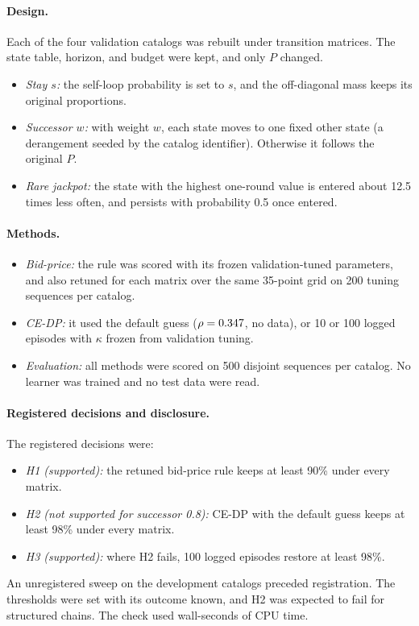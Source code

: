 \documentclass[10pt]{article}
\begin{document}
\paragraph{Design.} Each of the four validation catalogs was rebuilt under \trVariants{} transition matrices. The state table, horizon, and budget were kept, and only $P$ changed.
\begin{itemize}[leftmargin=*]
  \item \emph{Stay $s$:} the self-loop probability is set to $s$, and the off-diagonal mass keeps its original proportions.
  \item \emph{Successor $w$:} with weight $w$, each state moves to one fixed other state (a derangement seeded by the catalog identifier). Otherwise it follows the original $P$.
  \item \emph{Rare jackpot:} the state with the highest one-round value is entered about 12.5 times less often, and persists with probability 0.5 once entered.
\end{itemize}

\paragraph{Methods.}
\begin{itemize}[leftmargin=*]
  \item \emph{Bid-price:} the rule was scored with its frozen validation-tuned parameters, and also retuned for each matrix over the same 35-point grid on 200 tuning sequences per catalog.
  \item \emph{CE-DP:} it used the default guess ($\rho=0.347$, no data), or 10 or 100 logged episodes with $\kappa$ frozen from validation tuning.
  \item \emph{Evaluation:} all methods were scored on 500 disjoint sequences per catalog. No learner was trained and no test data were read.
\end{itemize}

\paragraph{Registered decisions and disclosure.} The registered decisions were:
\begin{itemize}[leftmargin=*]
  \item \emph{H1 (supported):} the retuned bid-price rule keeps at least 90\% under every matrix.
  \item \emph{H2 (not supported for successor 0.8):} CE-DP with the default guess keeps at least 98\% under every matrix.
  \item \emph{H3 (supported):} where H2 fails, 100 logged episodes restore at least 98\%.
\end{itemize}
An unregistered sweep on the development catalogs preceded registration. The thresholds were set with its outcome known, and H2 was expected to fail for structured chains. The check used \trWallSeconds{} wall-seconds of CPU time.
\end{document}
